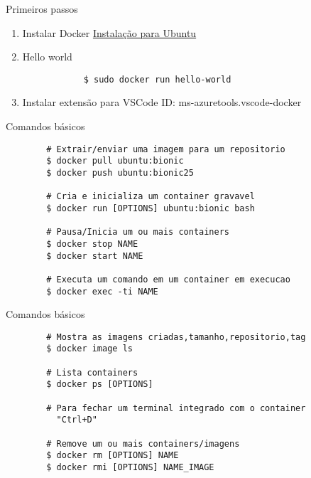 
\begin{frame}[fragile, t]{Primeiros passos}
    \begin{enumerate}
        \item Instalar Docker
            \href{https://docs.docker.com/engine/install/ubuntu/}{Instalação para Ubuntu}
        \item Hello world
        \begin{lstlisting}
            $ sudo docker run hello-world
        \end{lstlisting}
        \item Instalar extensão para VSCode
            ID: ms-azuretools.vscode-docker
    \end{enumerate}
\end{frame}
\begin{frame}[fragile, t]{Comandos básicos}

    \begin{lstlisting}
        # Extrair/enviar uma imagem para um repositorio
        $ docker pull ubuntu:bionic
        $ docker push ubuntu:bionic25

        # Cria e inicializa um container gravavel 
        $ docker run [OPTIONS] ubuntu:bionic bash

        # Pausa/Inicia um ou mais containers
        $ docker stop NAME
        $ docker start NAME

        # Executa um comando em um container em execucao
        $ docker exec -ti NAME 

    \end{lstlisting}
\end{frame}
\begin{frame}[fragile, t]{Comandos básicos}

    \begin{lstlisting}
        # Mostra as imagens criadas,tamanho,repositorio,tag 
        $ docker image ls

        # Lista containers
        $ docker ps [OPTIONS]

        # Para fechar um terminal integrado com o container
          "Ctrl+D"

        # Remove um ou mais containers/imagens
        $ docker rm [OPTIONS] NAME 
        $ docker rmi [OPTIONS] NAME_IMAGE 


    \end{lstlisting}
\end{frame}
